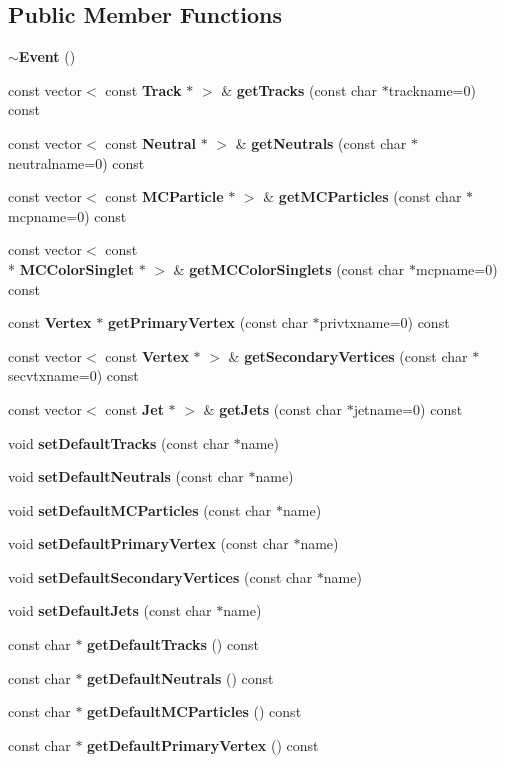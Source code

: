 \subsection*{Public Member Functions}
\begin{DoxyCompactItemize}
\item 
{\bf $\sim$\-Event} ()
\item 
const vector$<$ const {\bf Track} $\ast$ $>$ \& {\bf get\-Tracks} (const char $\ast$trackname=0) const 
\item 
const vector$<$ const {\bf Neutral} $\ast$ $>$ \& {\bf get\-Neutrals} (const char $\ast$neutralname=0) const 
\item 
const vector$<$ const {\bf M\-C\-Particle} $\ast$ $>$ \& {\bf get\-M\-C\-Particles} (const char $\ast$mcpname=0) const 
\item 
const vector$<$ const \\*
{\bf M\-C\-Color\-Singlet} $\ast$ $>$ \& {\bf get\-M\-C\-Color\-Singlets} (const char $\ast$mcpname=0) const 
\item 
const {\bf Vertex} $\ast$ {\bf get\-Primary\-Vertex} (const char $\ast$privtxname=0) const 
\item 
const vector$<$ const {\bf Vertex} $\ast$ $>$ \& {\bf get\-Secondary\-Vertices} (const char $\ast$secvtxname=0) const 
\item 
const vector$<$ const {\bf Jet} $\ast$ $>$ \& {\bf get\-Jets} (const char $\ast$jetname=0) const 
\item 
void {\bf set\-Default\-Tracks} (const char $\ast$name)
\item 
void {\bf set\-Default\-Neutrals} (const char $\ast$name)
\item 
void {\bf set\-Default\-M\-C\-Particles} (const char $\ast$name)
\item 
void {\bf set\-Default\-Primary\-Vertex} (const char $\ast$name)
\item 
void {\bf set\-Default\-Secondary\-Vertices} (const char $\ast$name)
\item 
void {\bf set\-Default\-Jets} (const char $\ast$name)
\item 
const char $\ast$ {\bf get\-Default\-Tracks} () const 
\item 
const char $\ast$ {\bf get\-Default\-Neutrals} () const 
\item 
const char $\ast$ {\bf get\-Default\-M\-C\-Particles} () const 
\item 
const char $\ast$ {\bf get\-Default\-Primary\-Vertex} () const 
\item 

\end{DoxyCompactItemize}
